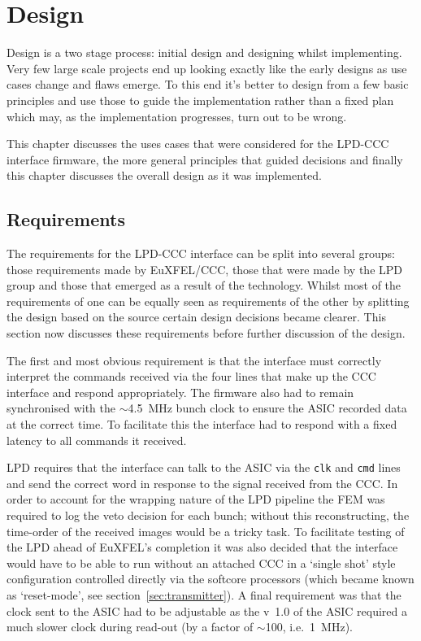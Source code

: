 \ifpdf
{}
\else
{}
\fi

\chapter{Design} %
\label{cha:design}
Design is a two stage process: initial design and designing whilst implementing. Very few large scale projects end up looking exactly like the early designs as use cases change and flaws emerge. To this end it's better to design from a few basic principles and use those to guide the implementation rather than a fixed plan which may, as the implementation progresses, turn out to be wrong.

This chapter discusses the uses cases that were considered for the LPD-CCC interface firmware, the more general principles that guided decisions and finally this chapter discusses the overall design as it was implemented.
\section{Requirements} %
\label{sec:requirements}
The requirements for the LPD-CCC interface can be split into several groups: those requirements made by EuXFEL/CCC, those that were made by the LPD group and those that emerged as a result of the technology. Whilst most of the requirements of one can be equally seen as requirements of the other by splitting the design based on the source certain design decisions became clearer. This section now discusses these requirements before further discussion of the design.

The first and most obvious requirement is that the interface must correctly interpret the commands received via the four lines that make up the CCC interface and respond appropriately. The firmware also had to remain synchronised with the \(\sim\)4.5~MHz bunch clock to ensure the ASIC recorded data at the correct time. To facilitate this the interface had to respond with a fixed latency to all commands it received. 

LPD requires that the interface can talk to the ASIC via the \texttt{clk} and \texttt{cmd} lines and send the correct word in response to the signal received from the CCC. In order to account for the wrapping nature of the LPD pipeline the FEM was required to log the veto decision for each bunch; without this reconstructing, the time-order of the received images would be a tricky task. To facilitate testing of the LPD ahead of EuXFEL's completion it was also decided that the interface would have to be able to run without an attached CCC in a `single shot' style configuration controlled directly via the softcore processors (which became known as `reset-mode', see section~\ref{sec:transmitter}). A final requirement was that the clock sent to the ASIC had to be adjustable as the v~1.0 of the ASIC required a much slower clock during read-out (by a factor of \( \sim \)100, i.e.\  1~MHz).
